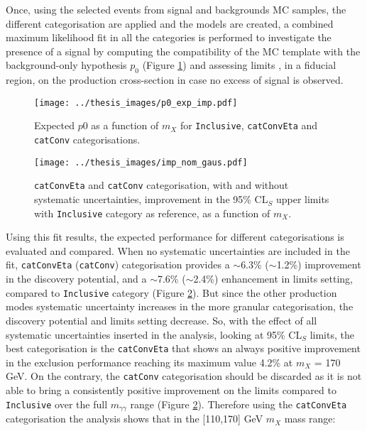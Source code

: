 \documentclass[a4paper, oneside, 11pt]{book}
\begin{document}
	Once, using the selected events from signal and backgrounds MC samples, the different categorisation are applied and the models are created, a combined maximum likelihood fit in all the categories is performed to investigate the presence of a signal by computing the compatibility of the MC template with the background-only hypothesis $p_0$ \cite{Statistic} (Figure \ref{fig:p0_comp}) and assessing limits \cite{Statistic}, in a fiducial region, on the production cross-section in case no excess of signal is observed.
	\iffalse
	\begin{figure}
		\centering
		\texttt{[image: ../thesis\_images/p0\_no\_catConvEta.pdf]}
		\caption{Expected $p_0$ values and observed ones values obtained by using signal+backgrounds template with $\mu$=1 and m$_X$ = 125 (140) GeV, for \texttt{Inclusive} categorisation, as function of $m_X$.}
		\label{fig:p0}
	\end{figure}
	\begin{figure}
		\centering
		\texttt{[image: ../thesis\_images/plot\_AsimovData\_0\_ggHyy\_MC\_no\_catConvEta\_syst\_HSM\_fid\_nom\_gaus.pdf]}
		\caption{95\% CL$_S$ upper limits plot for the \texttt{Inclusive} categorisation, as a function of $m_X$.}
		\label{fig:limits}
	\end{figure}
	\fi
	\begin{figure}
		\centering
		\texttt{[image: ../thesis\_images/p0\_exp\_imp.pdf]}
		\caption{Expected $p0$ as a function of $m_X$ for \texttt{Inclusive}, \texttt{catConvEta} and \texttt{catConv} categorisations.}
		\label{fig:p0_comp}
	\end{figure}
	\begin{figure}
		\centering
		\texttt{[image: ../thesis\_images/imp\_nom\_gaus.pdf]}
		\caption{\texttt{catConvEta} and \texttt{catConv} categorisation, with and without systematic uncertainties, improvement in the 95\% CL$_S$ upper limits with \texttt{Inclusive} category as reference, as a function of $m_X$.}
		\label{fig:limits_comp}
	\end{figure}Using this fit results, the expected performance for different categorisations is evaluated and compared. When no systematic uncertainties are included in the fit, \texttt{catConvEta} (\texttt{catConv}) categorisation provides a $\sim$6.3\% ($\sim$1.2\%) improvement in the discovery potential, and a $\sim$7.6\% ($\sim$2.4\%) enhancement in limits setting, compared to \texttt{Inclusive} category (Figure \ref{fig:limits_comp}). But since the other production modes systematic uncertainty increases in the more granular categorisation, the discovery potential and limits setting decrease. So, with the effect of all systematic uncertainties inserted in the analysis, looking at 95\% CL$_S$ limits, the best categorisation is the \texttt{catConvEta} that shows an always positive improvement in the exclusion performance reaching its maximum value 4.2\% at $m_X$ = 170 GeV. On the contrary, the \texttt{catConv} categorisation should be discarded as it is not able to bring a consistently positive improvement on the limits compared to \texttt{Inclusive} over the full $m_{\gamma\gamma}$ range (Figure \ref{fig:limits_comp}). Therefore using the \texttt{catConvEta} categorisation the analysis shows that in the [110,170] GeV $m_X$ mass range:
\end{document}
